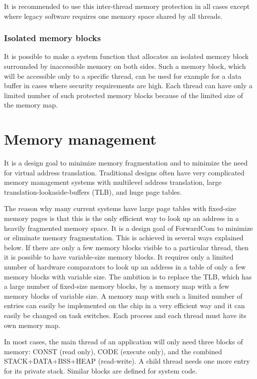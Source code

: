 \documentclass[forwardcom.tex]{subfiles}
\begin{document}
It is recommended to use this inter-thread memory protection in all cases except where legacy software requires one memory space shared by all threads. 
\vv

\subsubsection{Isolated memory blocks} \label{isolatedMemoryBlocks}
It is possible to make a system function that allocates an isolated memory block surrounded by inaccessible memory on both sides. Such a memory block, which will be accessible only to a specific thread, can be used for example for a data buffer in cases where security requirements are high. Each thread can have only a limited number of such protected memory blocks because of the limited size of the memory map.

\section{Memory management} \label{memoryManagement}
It is a design goal to minimize memory fragmentation and to minimize the need for virtual address translation. Traditional designs often have very complicated memory management systems with multilevel address translation, large translation-lookaside-buffers (TLB), and huge page tables. 
\vv

The reason why many current systems have large page tables with fixed-size memory pages is that this is the only efficient way to look up an address in a heavily fragmented memory space. It is a design goal of ForwardCom to minimize or eliminate memory fragmentation. This is achieved in several ways explained below. If there are only a few memory blocks visible to a particular thread, then it is possible to have variable-size memory blocks. It requires only a limited number of hardware comparators to look up an address in a table of only a few memory blocks with variable size. The ambition is to replace the TLB, which has a large number of fixed-size memory blocks, by a memory map with a few memory blocks of variable size. 
A memory map with such a limited number of entries can easily be implemented on the chip in a very efficient way and it can easily be changed on task switches. Each process and each thread must have its own memory map.
\vv

In most cases, the main thread of an application will only need three blocks of memory: CONST (read only), CODE (execute only), and the combined STACK+DATA+BSS+HEAP (read-write). A child thread needs one more entry for its private stack. Similar blocks are defined for system code. 
\vv
\end{document}
